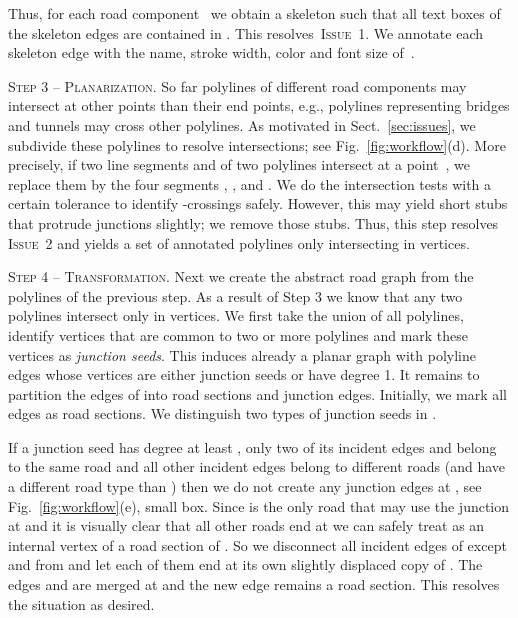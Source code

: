 \documentclass[a4paper,11pt]{article}
\newcommand{\ILanes}{\textsc{Issue~1}\xspace}
\newcommand{\ICrossings}{\textsc{Issue~2}\xspace}
\begin{document}
Thus, for each road component~ we obtain a skeleton such that all text
boxes of the skeleton edges are contained in . This resolves~\ILanes. We annotate each skeleton edge with the name, stroke width, color and font size of~.






\textsc{Step 3 -- Planarization.} So far polylines of different road
components may intersect at other points than their end points, e.g.,
polylines representing bridges and tunnels may cross other
polylines. As motivated in Sect.~\ref{sec:issues}, we subdivide these
polylines to resolve intersections; see
Fig.~\ref{fig:workflow}(d). More precisely, if two line segments
 and  of two polylines intersect at a point~, we
replace them by the four segments , ,
 and . We do the intersection tests
with a certain tolerance to identify -crossings
safely. However, this may yield short stubs that protrude
junctions slightly; we remove those stubs. Thus, this step resolves
\ICrossings and yields a set of annotated
 polylines only intersecting in vertices.


 \textsc{Step 4 -- Transformation.} 
 Next we create the abstract road
 graph from the polylines of the previous step. 
 As a result of Step 3 we know that any two polylines intersect only in vertices. We first take the union of all polylines, identify vertices that are common to two or more polylines and mark these vertices as \emph{junction seeds}. This induces already a planar graph  with polyline edges whose vertices  are either junction seeds or have degree 1. 
 It remains to partition the edges of  into road sections and junction edges. Initially, we mark all edges as road sections. 
 We distinguish two types of junction seeds in .
 
 If a junction seed  has degree at least , only two of its incident edges  and  belong to the same road  and all other incident edges belong to different roads (and have a different road type than ) then we do not create any junction edges at , see Fig.~\ref{fig:workflow}(e), small box.
 Since  is the only road that may use the junction at  and it is visually clear that all other roads end at  we can safely treat  as an internal vertex of a road section of .
 So we disconnect all incident edges of  except  and  from  and let each of them end at its own slightly displaced copy of . The edges  and  are merged at  and the new edge remains a road section. This resolves the situation as desired.
 
\end{document}
